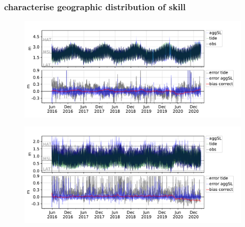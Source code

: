 \begin{frame}
\frametitle{characterise geographic distribution of skill}

      \begin{figure}      
        \includegraphics[height=0.4\textheight]{figures/plots/529020_verify_ts.pdf}
      \end{figure}
      \begin{figure}      
        \includegraphics[height=0.4\textheight]{figures/plots/523757_verify_ts.pdf}
      \end{figure}

\end{frame}

